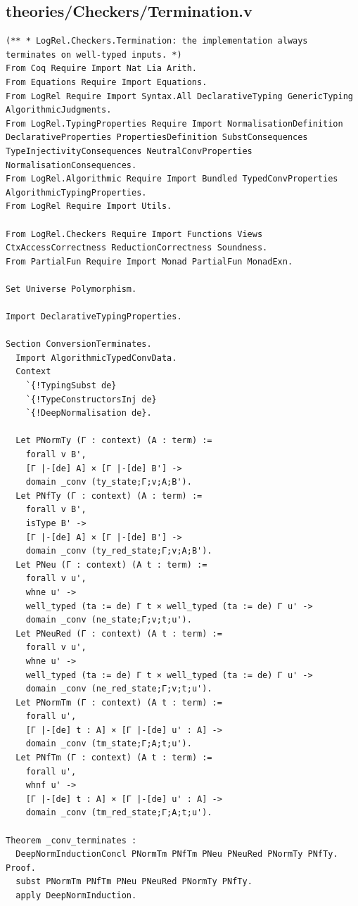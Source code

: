 \subsection*{theories/Checkers/Termination.v}
\begin{lstlisting}
(** * LogRel.Checkers.Termination: the implementation always terminates on well-typed inputs. *)
From Coq Require Import Nat Lia Arith.
From Equations Require Import Equations.
From LogRel Require Import Syntax.All DeclarativeTyping GenericTyping AlgorithmicJudgments.
From LogRel.TypingProperties Require Import NormalisationDefinition DeclarativeProperties PropertiesDefinition SubstConsequences TypeInjectivityConsequences NeutralConvProperties NormalisationConsequences.
From LogRel.Algorithmic Require Import Bundled TypedConvProperties AlgorithmicTypingProperties.
From LogRel Require Import Utils.

From LogRel.Checkers Require Import Functions Views CtxAccessCorrectness ReductionCorrectness Soundness.
From PartialFun Require Import Monad PartialFun MonadExn.

Set Universe Polymorphism.

Import DeclarativeTypingProperties.

Section ConversionTerminates.
  Import AlgorithmicTypedConvData.
  Context
    `{!TypingSubst de}
    `{!TypeConstructorsInj de}
    `{!DeepNormalisation de}.

  Let PNormTy (Γ : context) (A : term) :=
    forall v B',
    [Γ |-[de] A] × [Γ |-[de] B'] ->
    domain _conv (ty_state;Γ;v;A;B').
  Let PNfTy (Γ : context) (A : term) :=
    forall v B',
    isType B' ->
    [Γ |-[de] A] × [Γ |-[de] B'] ->
    domain _conv (ty_red_state;Γ;v;A;B').
  Let PNeu (Γ : context) (A t : term) :=
    forall v u',
    whne u' ->
    well_typed (ta := de) Γ t × well_typed (ta := de) Γ u' ->
    domain _conv (ne_state;Γ;v;t;u').
  Let PNeuRed (Γ : context) (A t : term) :=
    forall v u',
    whne u' ->
    well_typed (ta := de) Γ t × well_typed (ta := de) Γ u' ->
    domain _conv (ne_red_state;Γ;v;t;u').
  Let PNormTm (Γ : context) (A t : term) :=
    forall u',
    [Γ |-[de] t : A] × [Γ |-[de] u' : A] ->
    domain _conv (tm_state;Γ;A;t;u').
  Let PNfTm (Γ : context) (A t : term) :=
    forall u',
    whnf u' ->
    [Γ |-[de] t : A] × [Γ |-[de] u' : A] ->
    domain _conv (tm_red_state;Γ;A;t;u').

Theorem _conv_terminates :
  DeepNormInductionConcl PNormTm PNfTm PNeu PNeuRed PNormTy PNfTy.
Proof.
  subst PNormTm PNfTm PNeu PNeuRed PNormTy PNfTy.
  apply DeepNormInduction.


\end{lstlisting}
